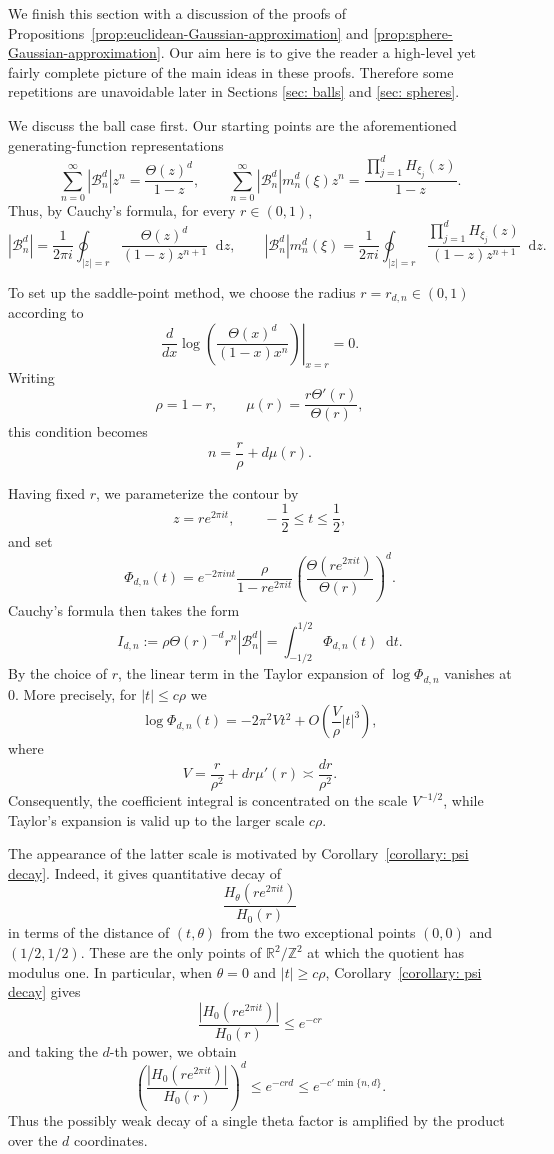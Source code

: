 \documentclass{article}
\newcommand{\Z}{\mathbb Z}
\newcommand{\R}{\mathbb R}
\newcommand{\dd}{\mathop{}\!\mathrm{d}}
\theoremstyle{plain}
\numberwithin{equation}{section}
\begin{document}
We finish this section with a discussion of the proofs of
Propositions~\ref{prop:euclidean-Gaussian-approximation} and
\ref{prop:sphere-Gaussian-approximation}. Our aim here is to give the reader a high-level yet fairly complete picture of the main ideas in these proofs. Therefore some repetitions are unavoidable later in Sections \ref{sec: balls} and \ref{sec: spheres}. 

We discuss the ball case first. Our starting points are the aforementioned generating-function representations
\[
\sum_{n=0}^{\infty}|\mathcal B_n^d|z^n
=
\frac{\Theta(z)^d}{1-z},
\qquad
\sum_{n=0}^{\infty}
|\mathcal B_n^d|m_n^d(\xi)z^n
=
\frac{\prod_{j=1}^dH_{\xi_j}(z)}{1-z}.
\]
Thus, by Cauchy's formula, for every \(r\in(0,1)\),
\[
|\mathcal B_n^d|
=
\frac{1}{2\pi i}
\oint_{|z|=r}
\frac{\Theta(z)^d}{(1-z)z^{n+1}}\dd z,
\qquad
|\mathcal B_n^d|m_n^d(\xi)
=
\frac{1}{2\pi i}
\oint_{|z|=r}
\frac{\prod_{j=1}^dH_{\xi_j}(z)}
     {(1-z)z^{n+1}}\dd z.
\]

To set up the saddle-point method, we choose the radius
\(r=r_{d,n}\in(0,1)\) according to
\[
\left.
\frac{d}{dx}
\log\left(
\frac{\Theta(x)^d}{(1-x)x^n}
\right)
\right|_{x=r}
=0.
\]
Writing
\[
\rho=1-r,
\qquad
\mu(r)=\frac{r\Theta'(r)}{\Theta(r)},
\]
this condition becomes
\[
n=\frac{r}{\rho}+d\mu(r).
\]

Having fixed \(r\), we parameterize the contour by
\[
z=re^{2\pi it},
\qquad -\frac12\leq t\leq\frac12,
\]
and set
\[
\Phi_{d,n}(t)
=
e^{-2\pi int}
\frac{\rho}{1-re^{2\pi it}}
\left(
\frac{\Theta(re^{2\pi it})}{\Theta(r)}
\right)^d.
\]
Cauchy's formula then takes the form
\[
I_{d,n}
:=
\rho\Theta(r)^{-d}r^n|\mathcal B_n^d|
=
\int_{-1/2}^{1/2}\Phi_{d,n}(t)\dd t.
\]
By the choice of \(r\), the linear term in the Taylor expansion of
\(\log\Phi_{d,n}\) vanishes at $0$. More precisely, for
\(|t|\leq c\rho\) we 
\[
\log\Phi_{d,n}(t)
=
-2\pi^2Vt^2
+
O\left(\frac{V}{\rho}|t|^3\right),
\]
where
\[
V
=
\frac{r}{\rho^2}
+
dr\mu'(r)
\asymp
\frac{dr}{\rho^2}.
\]
Consequently,  the coefficient integral is concentrated on the scale
\(V^{-1/2}\), while Taylor's expansion is valid up to the larger scale
\(c\rho\).

The appearance of the latter scale is motivated by
Corollary~\ref{corollary: psi decay}. Indeed, it gives quantitative decay of
\[
\frac{H_\theta(re^{2\pi it})}{H_0(r)}
\]
in terms of the distance of \((t,\theta)\) from the two exceptional
points \((0,0)\) and \((1/2,1/2)\). These are the only points of
\(\R^2/\Z^2\) at which the quotient has modulus one. In particular,
when \(\theta=0\) and \(|t|\geq c\rho\), Corollary~\ref{corollary: psi decay} gives
\[
\frac{|H_0(re^{2\pi it})|}{H_0(r)}
\leq e^{-cr}
\]
and taking the \(d\)-th power, we obtain
\[
\left(
\frac{|H_0(re^{2\pi it})|}{H_0(r)}
\right)^d
\leq e^{-crd}
\leq e^{-c'\min\{n,d\}}.
\]
Thus the possibly weak decay of a single theta factor is amplified by
the product over the \(d\) coordinates.
\end{document}
